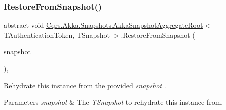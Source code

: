 \subsubsection{\texorpdfstring{Restore\+From\+Snapshot()}{RestoreFromSnapshot()}}
{\footnotesize\ttfamily abstract void \hyperlink{classCqrs_1_1Akka_1_1Snapshots_1_1AkkaSnapshotAggregateRoot}{Cqrs.\+Akka.\+Snapshots.\+Akka\+Snapshot\+Aggregate\+Root}$<$ T\+Authentication\+Token, T\+Snapshot $>$.Restore\+From\+Snapshot (\begin{DoxyParamCaption}\item[{T\+Snapshot}]{snapshot }\end{DoxyParamCaption})\hspace{0.3cm}{\ttfamily [protected]}, {}}



Rehydrate this instance from the provided {\itshape snapshot} . 


\begin{DoxyParams}{Parameters}
{\em snapshot} & The {\itshape T\+Snapshot}  to rehydrate this instance from.\\
\hline
\end{DoxyParams}
